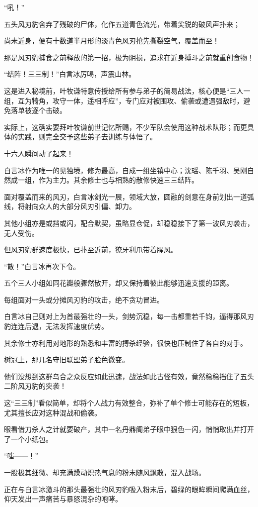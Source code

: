 “吼！”

五头风刃豹舍弃了残破的尸体，化作五道青色流光，带着尖锐的破风声扑来；

尚未近身，便有十数道半月形的淡青色风刃抢先撕裂空气，覆盖而至！

那是风刃豹捕食之前释放的第一招，极为阴损，追求在近身搏斗之前就重创食物！

“结阵！三三制！”白言冰厉喝，声震山林。

这是进入秘境前，叶牧谦特意传授给所有参与弟子的简易战法，核心便是“三人一组，互为犄角，攻守一体，遥相呼应”，专门应对被围攻、偷袭或遭遇强敌时，避免落单被逐个击破。

实际上，这确实要拜叶牧谦前世记忆所赐，不少军队会使用这种战术队形；而更具体的实践，则完全交予这些弟子去训练与体悟了。

十六人瞬间动了起来！

白言冰作为唯一的见独境，修为最高，自成一组坐镇中心；沈瑶、陈千羽、吴刚自然成一组，作为主力。其余修士也与相熟的散修快速三三结阵。

面对覆盖而来的风刃，白言冰剑光一展，领域大放，圆融的剑意在身前划出一道弧线，将射向众人的大部分风刃引偏、卸力。

其他小组亦是或挡或闪，配合默契，虽略显仓促，却稳稳接下了第一波风刃袭击，无人受伤。

但风刃豹群速度极快，已扑至近前，獠牙利爪带着腥风。

“散！”白言冰再次下令。

五个三人小组如同花瓣般骤然散开，却又保持着彼此能够迅速支援的距离。

每组面对一头或分摊风刃豹的攻击，绝不贪功冒进。

白言冰自己则对上为首最强壮的一头，剑势沉稳，每一击都重若千钧，逼得那风刃豹连连后退，无法发挥速度优势。

其余修士亦利用对地形的熟悉和丰富的搏杀经验，很快也压制住了各自的对手。

树冠上，那几名守旧联盟弟子脸色微变。

他们没想到这群乌合之众反应如此迅速，战法如此古怪有效，竟然稳稳挡住了五头二阶风刃豹的突袭！

这“三三制”看似简单，却将个人战力有效整合，弥补了单个修士可能存在的短板，尤其擅长应对这种混战和偷袭。

眼看借刀杀人之计就要破产，其中一名丹鼎阁弟子眼中狠色一闪，悄悄取出并打开了一个小纸包。

“嗤——！”

一股极其细微、却充满躁动炽热气息的粉末随风飘散，混入战场。

正在与白言冰激斗的那头最强壮的风刃豹吸入粉末后，碧绿的眼眸瞬间爬满血丝，仰天发出一声痛苦与暴怒混杂的咆哮。

